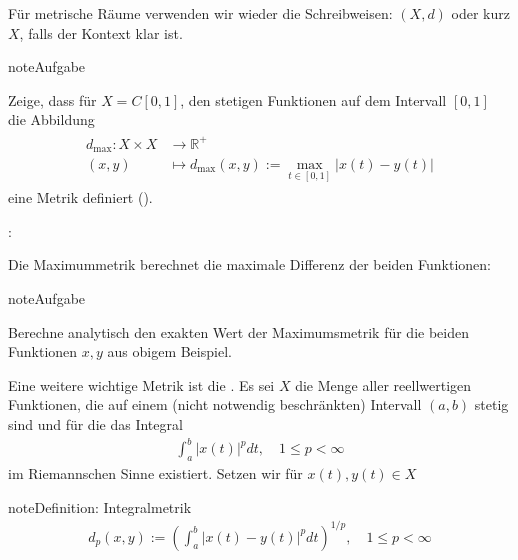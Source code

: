 \documentclass[letterpaper,10pt,english]{jupyterBook}
\begin{document}
Für metrische Räume verwenden wir wieder die Schreibweisen: \((X, d)\) oder kurz \(X\), falls der Kontext klar ist.

\begin{sphinxadmonition}{note}{Aufgabe}

Zeige, dass für \(X = C[0,1]\), den stetigen Funktionen auf dem Intervall \([0,1]\) die Abbildung
\begin{equation}\label{equation:Funktionalanalysis/Funktionalanalysis:eq:maxnorm}
\begin{split}\begin{split}d_{\text{max}} : X \times X & \to \mathbb{R}^+\\
(x,y) & \mapsto d_{\text{max}}(x,y) := \max_{t\in[0,1]} |x(t)-y(t)|\end{split}\end{split}
\end{equation}
eine Metrik definiert ().
\end{sphinxadmonition}

:

\noindent{}

Die Maximummetrik berechnet die maximale Differenz der beiden Funktionen:

\noindent{}

\begin{sphinxadmonition}{note}{Aufgabe}

Berechne analytisch den exakten Wert der Maximumsmetrik für die beiden Funktionen \(x,y\) aus obigem Beispiel.
\end{sphinxadmonition}

Eine weitere wichtige Metrik ist die . Es sei \(X\) die Menge aller reellwertigen Funktionen, die auf einem (nicht notwendig beschränkten) Intervall \((a,b)\) stetig sind und für die das Integral
\begin{equation*}
\begin{split}\int_a^b |x(t)|^p dt, \quad 1\le p < \infty\end{split}
\end{equation*}
im Riemannschen Sinne existiert. Setzen wir für \(x(t), y(t)\in X\)

\begin{sphinxadmonition}{note}{Definition: Integralmetrik}
\begin{equation*}
\begin{split}d_p(x,y) := \left(\int_a^b |x(t)-y(t)|^p dt\right)^{1/p},\quad 1\le p < \infty\end{split}
\end{equation*}\end{sphinxadmonition}
\end{document}
